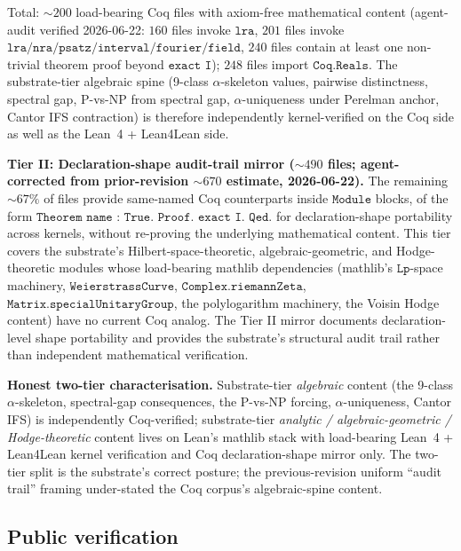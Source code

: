 \documentclass[11pt,a4paper]{amsart}
\theoremstyle{plain}
\theoremstyle{definition}
\begin{document}
Total: $\sim 200$ load-bearing Coq files with axiom-free mathematical content (agent-audit verified 2026-06-22: $160$ files invoke $\texttt{lra}$, $201$ files invoke $\texttt{lra}/\texttt{nra}/\texttt{psatz}/\texttt{interval}/\texttt{fourier}/\texttt{field}$, $240$ files contain at least one non-trivial theorem proof beyond $\texttt{exact I}$); $248$ files import $\texttt{Coq.Reals}$. The substrate-tier algebraic spine (9-class $\alpha$-skeleton values, pairwise distinctness, spectral gap, P-vs-NP from spectral gap, $\alpha$-uniqueness under Perelman anchor, Cantor IFS contraction) is therefore independently kernel-verified on the Coq side as well as the Lean~4 + Lean4Lean side.

\textbf{Tier II: Declaration-shape audit-trail mirror ($\sim 490$ files; agent-corrected from prior-revision $\sim 670$ estimate, 2026-06-22).} The remaining $\sim 67\%$ of files provide same-named Coq counterparts inside $\texttt{Module}$ blocks, of the form $\texttt{Theorem name : True. Proof. exact I. Qed.}$ for declaration-shape portability across kernels, without re-proving the underlying mathematical content. This tier covers the substrate's Hilbert-space-theoretic, algebraic-geometric, and Hodge-theoretic modules whose load-bearing mathlib dependencies (mathlib's $\texttt{Lp}$-space machinery, $\texttt{WeierstrassCurve}$, $\texttt{Complex.riemannZeta}$, $\texttt{Matrix.specialUnitaryGroup}$, the polylogarithm machinery, the Voisin Hodge content) have no current Coq analog. The Tier II mirror documents declaration-level shape portability and provides the substrate's structural audit trail rather than independent mathematical verification.

\textbf{Honest two-tier characterisation.} Substrate-tier \emph{algebraic} content (the 9-class $\alpha$-skeleton, spectral-gap consequences, the P-vs-NP forcing, $\alpha$-uniqueness, Cantor IFS) is independently Coq-verified; substrate-tier \emph{analytic / algebraic-geometric / Hodge-theoretic} content lives on Lean's mathlib stack with load-bearing Lean~4 + Lean4Lean kernel verification and Coq declaration-shape mirror only. The two-tier split is the substrate's correct posture; the previous-revision uniform ``audit trail'' framing under-stated the Coq corpus's algebraic-spine content.

\subsection{Public verification}
\end{document}
